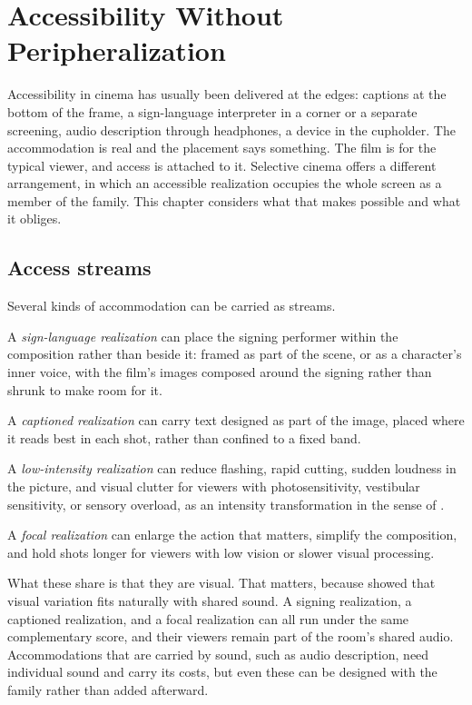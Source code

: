 \chapter{Accessibility Without Peripheralization}\label{ch:accessibility}

Accessibility in cinema has usually been delivered at the edges: captions at the bottom of the frame, a sign-language interpreter in a corner or a separate screening, audio description through headphones, a device in the cupholder. The accommodation is real and the placement says something. The film is for the typical viewer, and access is attached to it. Selective cinema offers a different arrangement, in which an accessible realization occupies the whole screen as a member of the family. This chapter considers what that makes possible and what it obliges.

\section{Access streams}

Several kinds of accommodation can be carried as streams.

A \emph{sign-language realization} can place the signing performer within the composition rather than beside it: framed as part of the scene, or as a character's inner voice, with the film's images composed around the signing rather than shrunk to make room for it.

A \emph{captioned realization} can carry text designed as part of the image, placed where it reads best in each shot, rather than confined to a fixed band.

A \emph{low-intensity realization} can reduce flashing, rapid cutting, sudden loudness in the picture, and visual clutter for viewers with photosensitivity, vestibular sensitivity, or sensory overload, as an intensity transformation in the sense of .

A \emph{focal realization} can enlarge the action that matters, simplify the composition, and hold shots longer for viewers with low vision or slower visual processing.

What these share is that they are visual. That matters, because  showed that visual variation fits naturally with shared sound. A signing realization, a captioned realization, and a focal realization can all run under the same complementary score, and their viewers remain part of the room's shared audio. Accommodations that are carried by sound, such as audio description, need individual sound and carry its costs, but even these can be designed with the family rather than added afterward.

